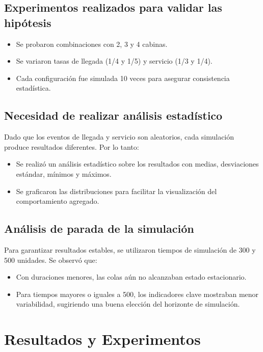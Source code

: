 \documentclass[12pt]{article}
\begin{document}
\subsection*{Experimentos realizados para validar las hipótesis}
\begin{itemize}
    \item Se probaron combinaciones con 2, 3 y 4 cabinas.
    \item Se variaron tasas de llegada (1/4 y 1/5) y servicio (1/3 y 1/4).
    \item Cada configuración fue simulada 10 veces para asegurar consistencia estadística.
\end{itemize}

\subsection*{Necesidad de realizar análisis estadístico}
Dado que los eventos de llegada y servicio son aleatorios, cada simulación produce resultados diferentes. Por lo tanto:
\begin{itemize}
    \item Se realizó un análisis estadístico sobre los resultados con medias, desviaciones estándar, mínimos y máximos.
    \item Se graficaron las distribuciones para facilitar la visualización del comportamiento agregado.
\end{itemize}

\subsection*{Análisis de parada de la simulación}
Para garantizar resultados estables, se utilizaron tiempos de simulación de 300 y 500 unidades. Se observó que:
\begin{itemize}
    \item Con duraciones menores, las colas aún no alcanzaban estado estacionario.
    \item Para tiempos mayores o iguales a 500, los indicadores clave mostraban menor variabilidad, sugiriendo una buena elección del horizonte de simulación.
\end{itemize}

\section{Resultados y Experimentos}
\end{document}

